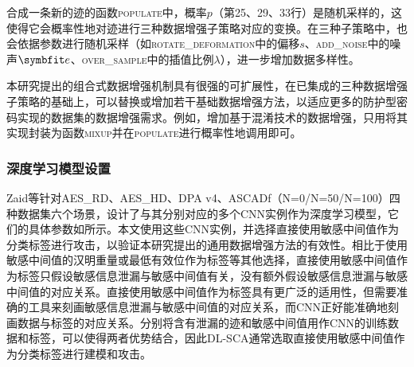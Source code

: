 {	合成一条新的迹的函数\textsc{populate}中，概率$p$（第25、29、33行）是随机采样的，这使得它会概率性地对迹进行三种数据增强子策略对应的变换。在三种子策略中，也会依据参数进行随机采样（如\textsc{rotate\_deformation}中的偏移$s$、\textsc{add\_noise}中的噪声$\Vector e$、\textsc{over\_sample}中的插值比例$\lambda$），进一步增加数据多样性。
	
	本研究提出的组合式数据增强机制具有很强的可扩展性，在已集成的三种数据增强子策略的基础上，可以替换或增加若干基础数据增强方法，以适应更多的防护型密码实现的数据集的数据增强需求。例如，增加基于混淆技术的数据增强，只用将其实现封装为函数\textsc{mixup}并在\textsc{populate}进行概率性地调用即可。
	\subsubsection{深度学习模型设置}
	Zaid等\citep{Zaid20}针对AES\_RD、AES\_HD、DPA v4、ASCADf（N=0/N=50/N=100）四种数据集六个场景，设计了与其分别对应的多个CNN实例作为深度学习模型，它们的具体参数如所示。本文使用这些CNN实例，并选择直接使用敏感中间值作为分类标签进行攻击，以验证本研究提出的通用数据增强方法的有效性。相比于使用敏感中间值的汉明重量或最低有效位作为标签等其他选择，直接使用敏感中间值作为标签只假设敏感信息泄漏与敏感中间值有关，没有额外假设敏感信息泄漏与敏感中间值的对应关系。直接使用敏感中间值作为标签具有更广泛的适用性，但需要准确的工具来刻画敏感信息泄漏与敏感中间值的对应关系，而CNN正好能准确地刻画数据与标签的对应关系。分别将含有泄漏的迹和敏感中间值用作CNN的训练数据和标签，可以使得两者优势结合，因此DL-SCA通常选取直接使用敏感中间值作为分类标签进行建模和攻击。
	
}
